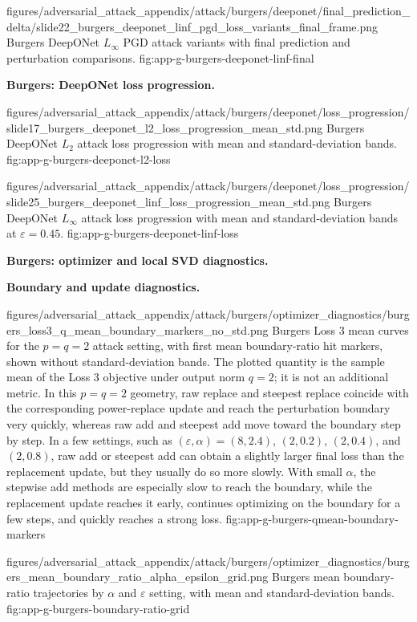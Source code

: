 ﻿\documentclass[letterpaper]{article} %
\begin{document}
\appendixattackfigcompact
  {figures/adversarial_attack_appendix/attack/burgers/deeponet/final_prediction_delta/slide22_burgers_deeponet_linf_pgd_loss_variants_final_frame.png}
  {Burgers DeepONet $L_\infty$ PGD attack variants with final prediction and
  perturbation comparisons.}
  {fig:app-g-burgers-deeponet-linf-final}

\noindent\textbf{Burgers: DeepONet loss progression.}

\appendixattackfig
  {figures/adversarial_attack_appendix/attack/burgers/deeponet/loss_progression/slide17_burgers_deeponet_l2_loss_progression_mean_std.png}
  {Burgers DeepONet $L_2$ attack loss progression with mean and
  standard-deviation bands.}
  {fig:app-g-burgers-deeponet-l2-loss}

\appendixattackfig
  {figures/adversarial_attack_appendix/attack/burgers/deeponet/loss_progression/slide25_burgers_deeponet_linf_loss_progression_mean_std.png}
  {Burgers DeepONet $L_\infty$ attack loss progression with mean and
  standard-deviation bands at $\varepsilon=0.45$.}
  {fig:app-g-burgers-deeponet-linf-loss}

\clearpage
\noindent\textbf{Burgers: optimizer and local SVD diagnostics.}

\noindent\textbf{Boundary and update diagnostics.}

\appendixattackfig
  {figures/adversarial_attack_appendix/attack/burgers/optimizer_diagnostics/burgers_loss3_q_mean_boundary_markers_no_std.png}
  {Burgers Loss 3 mean curves for the $p=q=2$ attack setting, with first mean
  boundary-ratio hit markers, shown without standard-deviation bands. The
  plotted quantity is the sample mean of the Loss 3 objective under output
  norm $q=2$; it is not an additional metric. In this $p=q=2$ geometry, raw
  replace and steepest replace coincide with the corresponding power-replace
  update and reach the
  perturbation boundary very quickly, whereas raw add and steepest add move
  toward the boundary step by step. In a few settings, such as
  $(\varepsilon,\alpha)=(8,2.4)$, $(2,0.2)$, $(2,0.4)$, and $(2,0.8)$, raw add or
  steepest add can obtain a slightly larger final loss than the replacement
  update, but they usually do so more slowly. With small $\alpha$, the stepwise
  add methods are especially slow to reach the boundary, while the replacement
  update reaches it early, continues optimizing on the boundary for a few steps,
  and quickly reaches a strong loss.}
  {fig:app-g-burgers-qmean-boundary-markers}

\appendixattackfig
  {figures/adversarial_attack_appendix/attack/burgers/optimizer_diagnostics/burgers_mean_boundary_ratio_alpha_epsilon_grid.png}
  {Burgers mean boundary-ratio trajectories by $\alpha$ and $\varepsilon$ setting,
  with mean and standard-deviation bands.}
  {fig:app-g-burgers-boundary-ratio-grid}
\end{document}
